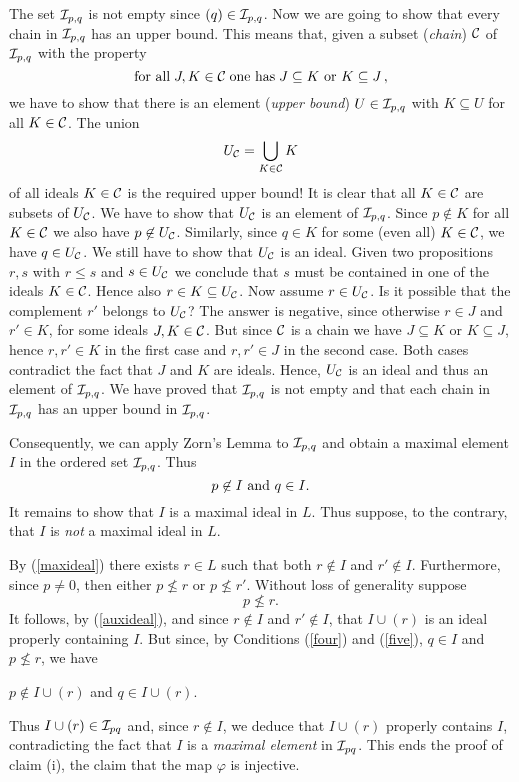 The set ${\cal I}_{p,q}$ is not empty since $(q) \in {\cal I}_{p,q}$.
Now we are going to show
that every chain in ${\cal I}_{p,q}$ has an upper bound.
This means that, given a subset ({\em chain}) ${\cal C}$ of
${\cal I}_{p,q}$ with the property
\[ {\rm for \mbox{ } all} \; J,K \in {\cal C} \;
{\rm one \mbox{ }  has} \; J \subseteq  K \ \mbox{\rm or } K \subseteq J \,, \]
we have to show that there is an element ({\em upper bound})
$U  \in {\cal I}_{p,q}$ with
$K \subseteq U$ for all $K \in {\cal C}$. The union
\[ U_{\cal C} = \bigcup_{K \in {\cal C}} K \]
of all ideals $K \in {\cal C}$ is the required upper bound!
It is clear that all $K \in {\cal C}$ are subsets of $U_{\cal C}$.
We have to show
that $U_{\cal C}$ is an element of ${\cal I}_{p,q}$. Since $p \not\in K$ for all
$K \in {\cal C}$ we also have $p \not\in U_{\cal C}$. Similarly, since
$q \in K$ for some (even all) $K \in {\cal C}$, we have $q \in U_{\cal C}$.
We still have to show that $U_{\cal C}$ is an ideal.
Given two propositions $r,s$ with $r \leq s$ and $s \in U_{\cal C}$ we
conclude that $s$ must be contained in one of the ideals $K \in {\cal C}$.
Hence also $r \in K \subseteq U_{\cal C}$. Now assume $r \in U_{\cal C}$.
Is it possible that  the complement $r'$ belongs to $U_{\cal C}$? The
answer is negative, since otherwise
$r \in J$ and $r' \in K$, for some ideals $J,K \in {\cal C}$. But since
${\cal C}$ is a chain we have $J \subseteq K$ or $K \subseteq J$, hence
$r, r' \in K$ in the first case and $r, r' \in J$ in the second case. Both
cases contradict the fact that $J$ and $K$ are ideals.
Hence, $U_{\cal C}$ is an ideal and thus an element of ${\cal I}_{p,q}$.
We have proved that ${\cal I}_{p,q}$ is not empty and that each chain in
${\cal I}_{p,q}$ has an upper bound in ${\cal I}_{p,q}$.

Consequently, we can apply Zorn's Lemma to ${\cal I}_{p,q}$ and obtain a maximal
element $I$ in the ordered set ${\cal I}_{p,q}$.
Thus
\begin{equation}\label{four}
p\not\in I\ {\rm and}\ q\in I.
\end{equation}
 It remains to show that $I$ is a maximal ideal in $L$. Thus suppose, to
the contrary, that $I$
is {\em not\/} a maximal ideal in $L$.

By (\ref{maxideal}) there exists $r\in L$ such that both
$r\not\in I$ and $r'\not\in I$.
Furthermore, since $p\neq 0$, then either $p\not\le r$ or $p\not\le r'$.
Without
loss of generality suppose
\begin{equation}\label{five}
p\not\le r.
\end{equation}
It follows, by (\ref{auxideal}), and since $r\not\in I$ and
$r'\not\in I$, that $I\cup(r)$ is an
ideal properly containing $I$.  But since, by Conditions (\ref{four}) and
(\ref{five}), $q\in I$ and
$p\not\le r$, we have
\begin{center}
$p\not\in I\cup(r)$ and $q\in I\cup(r)$.
\end{center}
Thus $I\cup(r)\in {\cal I}_{pq}$ and, since $r\not\in I$, we deduce
that $I\cup(r)$ properly contains $I$,
contradicting the fact that $I$ is a {\em maximal element} in ${\cal
I}_{pq}$.
This ends the proof of claim (i),
the claim that the map $\varphi$ is injective.

